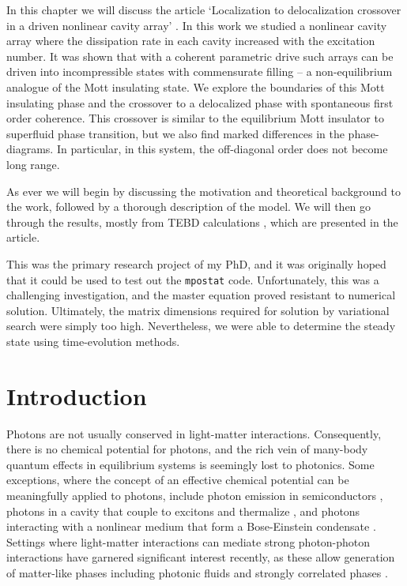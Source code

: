 In this chapter we will discuss the article `Localization to delocalization crossover in a driven nonlinear cavity array' \cite{Brown2018}. In this work we studied a nonlinear cavity array where the dissipation rate in each cavity increased with the excitation number. It was shown that with a coherent parametric drive such arrays can be driven into incompressible states with commensurate filling -- a non-equilibrium analogue of the Mott insulating state. We explore the boundaries of this Mott insulating phase and the crossover to a delocalized phase with spontaneous first order coherence. This crossover is similar to the equilibrium Mott insulator to superfluid phase transition, but we also find marked differences in the phase-diagrams. In particular, in this system, the off-diagonal order does not become long range.

As ever we will begin by discussing the motivation and theoretical background to the work, followed by a thorough description of the model. We will then go through the results, mostly from TEBD calculations \cite{Vidal2003}, which are presented in the article.

This was the primary research project of my PhD, and it was originally hoped that it could be used to test out the \lstinline$mpostat$ code. Unfortunately, this was a challenging investigation, and the master equation proved resistant to numerical solution. Ultimately, the matrix dimensions required for solution by variational search were simply too high. Nevertheless, we were able to determine the steady state using time-evolution methods.

\section{Introduction}

Photons are not usually conserved in light-matter interactions. Consequently, there is no chemical potential for photons, and the rich vein of many-body quantum effects in equilibrium systems is seemingly lost to photonics. Some exceptions, where the concept of an effective chemical potential can be meaningfully applied to photons, include photon emission in semiconductors \cite{Wurfel1982}, photons in a cavity that couple to excitons and thermalize \cite{Keeling2007,Eastham2001,Carusotto2013}, and photons interacting with a nonlinear medium that form a Bose-Einstein condensate \cite{Kasprzak2006,Klaers2010}. Settings where light-matter interactions can mediate strong photon-photon interactions have garnered significant interest recently, as these allow generation of matter-like phases including photonic fluids \cite{Carusotto2013,Vocke2015} and strongly correlated phases \cite{Hartmann2008,Hartmann2016,Noh2017}.

